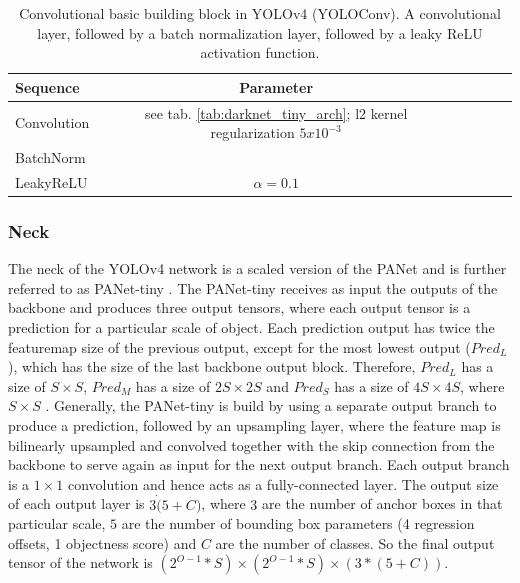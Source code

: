 \begin{table} %
\begin{center}

\begin{tabular}{l|c|c|c|c|c}
    \textbf{Sequence} & \textbf{Parameter}\\
    \hline
    Convolution & see tab. \ref{tab:darknet_tiny_arch}; l2 kernel regularization $5x10^{-3}$\\
    BatchNorm &\\
    LeakyReLU & $\alpha = 0.1$\\

\end{tabular}
\caption{Convolutional basic building block in YOLOv4 (YOLOConv). A convolutional layer, followed by a batch normalization layer, followed by a leaky ReLU activation function.}
\label{tab:yoloconv}

\end{center}
\end{table}

\subsubsection{Neck}

The neck of the \ac{YOLOv4} network is a scaled version of the \ac{PANet} \cite{pannet} and is further referred to as PANet-tiny \cite{yolov4_tiny}.
The PANet-tiny receives as input the outputs of the backbone and produces three output tensors, where each output tensor is a prediction for a particular scale of object.
Each prediction output has twice the featuremap size of the previous output, except for the most lowest output ($Pred_L$), which has the size of the last backbone output block.
Therefore, $Pred_L$ has a size of $S \times S$, $Pred_M$ has a size of $2S \times 2S$ and $Pred_S$ has a size of $4S \times 4S$, where $S \times S$ .
Generally, the PANet-tiny is build by using a separate output branch to produce a prediction, followed by an upsampling layer, where the feature map is bilinearly upsampled and convolved together with the skip connection from the backbone to serve again as input for the next output branch.
Each output branch is a $1 \times 1$ convolution and hence acts as a fully-connected layer.
The output size of each output layer is $3 \dot (5+C)$, where $3$ are the number of anchor boxes in that particular scale, $5$ are the number of bounding box parameters (4 regression offsets, 1 objectness score) and $C$ are the number of classes.
So the final output tensor of the network is $(2^{O-1}*S) \times (2^{O-1}*S) \times (3*(5+C))$.


